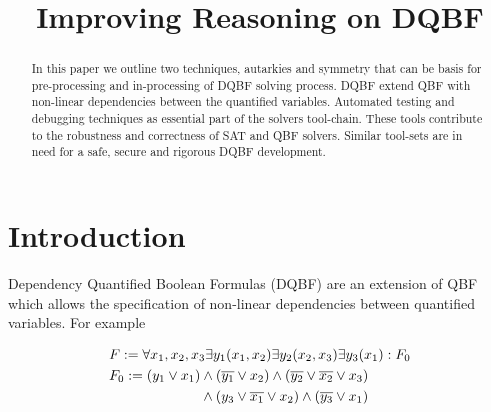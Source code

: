 \documentclass[conference]{IEEEtran}
\begin{document}
\title{Improving Reasoning on DQBF}


\author{
}

\maketitle

\begin{abstract}
In this paper we outline two techniques, autarkies and symmetry that
%
can be basis for pre-processing and in-processing of DQBF solving process.
%
DQBF extend QBF with non-linear dependencies between the quantified variables.
%
Automated testing and debugging techniques as essential part of the solvers tool-chain.
%
These tools contribute to the robustness and correctness of SAT and QBF solvers.
%
Similar tool-sets are in need for a safe, secure and rigorous DQBF development.
%
%    
\end{abstract}



\section{Introduction}
\label{sec:Intro}
Dependency Quantified Boolean Formulas (DQBF) are an extension of QBF
which allows the specification of non-linear dependencies between quantified variables. 
%
%
For example \par\noindent
%
\begin{equation}
\begin{split}
&F := \forall x_1,x_2,x_3 \exists y_1(x_1,x_2) \exists y_2(x_2,x_3) \exists y_3(x_1): F_0 \\
&F_0 := (y_1 \vee x_1) \wedge (\overline{y_1} \vee x_2) \wedge (\overline{y_2} \vee \overline{x_2} \vee x_3) \\
&\hspace{2.3cm}\wedge (y_3 \vee \overline{x_1} \vee x_2) \wedge (\overline{y_3} \vee x_1)
\end{split}
\label{eqn:ex}
\end{equation}
\end{document}
